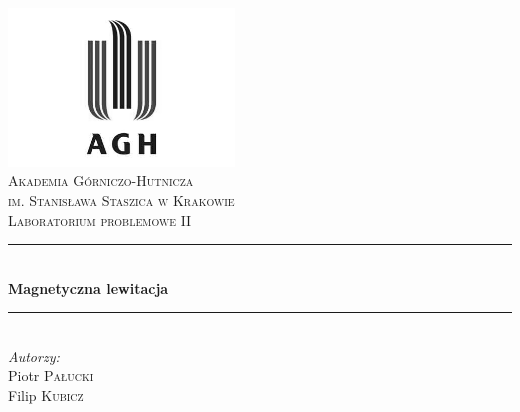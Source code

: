 \begin{titlepage}

\newcommand{\HRule}{\rule{\linewidth}{0.5mm}}

\center
 

\includegraphics[width=6cm]{../res/img/logo.png}\\[1cm]
 
 

\textsc{\LARGE Akademia Górniczo-Hutnicza \\[0.2cm]
im. Stanisława Staszica w Krakowie}\\[1.5cm]

\textsc{\Large Laboratorium problemowe II}\\[0.5cm]


\HRule \\[0.5cm]
{ \huge \bfseries Magnetyczna lewitacja}\\[0.3cm]
\HRule \\[1.5cm]

\flushright
\Large \emph{Autorzy:}\\
Piotr \textsc{Pałucki}\\[0.1cm]  %
Filip \textsc{Kubicz}\\[3cm]        %



\vfill %

\end{titlepage}